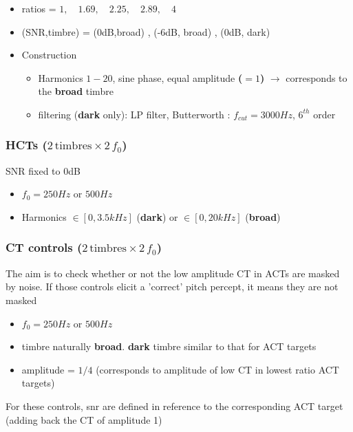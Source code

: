 \documentclass[11pt,a4paper,oneside]{article}
\begin{document}
\begin{itemize}
\item  ratios = $1, \quad 1.69,\quad 2.25,\quad 2.89,\quad 4$
\item  (SNR,timbre) = (0dB,broad) , (-6dB, broad) , (0dB, dark)
\item Construction
  \begin{itemize}
  \item  Harmonics $1-20$, sine phase, equal amplitude \textbf{($=1$)} $\rightarrow$ corresponds to the \textbf{broad} timbre
  \item  filtering (\textbf{dark} only): LP filter, Butterworth : $f_{cut} = 3000 Hz$, $6^{th}$ order
  \end{itemize}
\end{itemize}




\subsubsection{HCTs ($2 \, \text{timbres} \times 2 \, f_0 $)}

SNR fixed to 0dB

\begin{itemize}
\item $f_0 = 250Hz$ or  $500 Hz$
\item Harmonics $\in [0, 3.5 kHz]$ (\textbf{dark}) or $\in [0, 20 kHz]$ (\textbf{broad}) 
\end{itemize}


\subsubsection{CT controls ($2 \, \text{timbres} \times 2 \, f_0 $)}

The aim is to check whether or not the low amplitude CT in ACTs are masked by noise.
If those controls elicit a 'correct' pitch percept, it means they are not masked

\begin{itemize}
\item $f_0 = 250Hz$ or  $500 Hz$
\item timbre naturally \textbf{broad}. \textbf{dark} timbre similar to that for ACT targets
\item   amplitude = $1/4$ (corresponds to amplitude of low CT in lowest ratio ACT targets) 
\end{itemize}

For these controls, snr are defined in reference to the corresponding ACT target (adding back the CT of amplitude 1)
\end{document}
